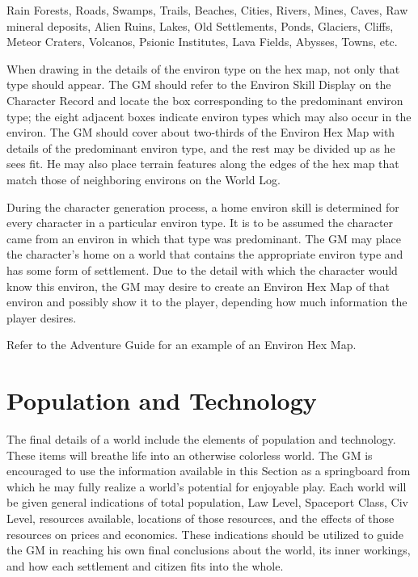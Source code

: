 Rain Forests, Roads, Swamps, Trails, Beaches, Cities, Rivers, Mines,
Caves, Raw mineral deposits, Alien Ruins, Lakes, Old Settlements,
Ponds, Glaciers, Cliffs, Meteor Craters, Volcanos, Psionic
Institutes, Lava Fields, Abysses, Towns, etc.

When drawing in the details of the environ type on the hex map, not
only that type should appear. The GM should refer to the Environ Skill
Display on the Character Record and locate the box corresponding to
the predominant environ type; the eight adjacent boxes indicate
environ types which may also occur in the environ. The GM should cover
about two-thirds of the Environ Hex Map with details of the
predominant environ type, and the rest may be divided up as he sees
fit. He may also place terrain features along the edges of the hex map
that match those of neighboring environs on the World Log.

During the character generation process, a home environ skill is
determined for every character in a particular environ type. It is to
be assumed the character came from an environ in which that type was
predominant. The GM may place the character's home on a world that
contains the appropriate environ type and has some form of settlement.
Due to the detail with which the character would know this environ,
the GM may desire to create an Environ Hex Map of that environ and
possibly show it to the player, depending how much information the
player desires.

Refer to the Adventure Guide for an example of an Environ Hex Map.

\section{Population and Technology}
\label{sec:population-technology}

The final details of a world include the elements of population and
technology. These items will breathe life into an otherwise colorless
world. The GM is encouraged to use the information available in this
Section as a springboard from which he may fully realize a world's
potential for enjoyable play. Each world will be given general
indications of total population, Law Level, Spaceport Class, Civ
Level, resources available, locations of those resources, and the
effects of those resources on prices and economics. These indications
should be utilized to guide the GM in reaching his own final
conclusions about the world, its inner workings, and how each
settlement and citizen fits into the whole.


